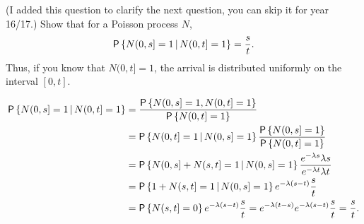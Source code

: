 \begin{question}(\tbd I added this question to clarify the next question, you can skip it for year 16/17.)
Show that  for a Poisson process $N$, 
\begin{equation*}
  \P{N(0,s] =1\given N(0,t]=1} = \frac st.
\end{equation*}
Thus, if you know that $N(0,t]=1$, the arrival is distributed
uniformly on the interval $[0,t]$.


\begin{hint}
\hint{Use Bayes' law for conditional probability. Observe that 
  \begin{equation*}
\{N(0,s]+N(s,t]=1\}\cap\{N(0,s]=1\} = \{1+N(s,t]=1\}\cap\{N(0,s]=1\}=\{N(s,t]=0\}\cap\{N(0,s]=1\}.
  \end{equation*}
}
\end{hint}

\begin{solution}
\begin{equation*}
  \begin{split}
  \P{N(0,s] =1\given N(0,t]=1} 
&= \frac{\P{N(0,s] =1, N(0,t]=1}}{\P{N(0,t]=1}} \\
&=   \P{N(0,t] =1\given N(0,s]=1} \frac{\P{N(0,s] =1}}{\P{N(0,t]=1}} \\
&=   \P{N(0,s] + N(s,t] =1\given N(0,s]=1} \frac{e^{-\lambda s}\lambda s}{e^{-\lambda t} \lambda t} \\
&=   \P{1 + N(s,t] =1\given N(0,s]=1} e^{-\lambda (s-t)} \frac{s}{t} \\
&=   \P{N(s,t] =0} e^{-\lambda (s-t)} \frac{s}{t} = e^{-\lambda(t-s)} e^{-\lambda (s-t)} \frac{s}{t} = \frac st.
  \end{split}
\end{equation*}
\end{solution}
\end{question}


